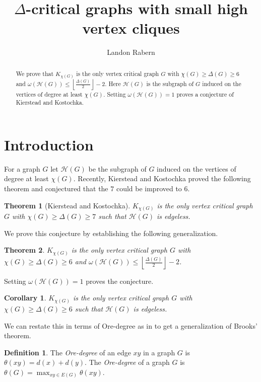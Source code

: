 \documentclass[11pt]{amsart}
\title{$\Delta$-critical graphs with small high vertex cliques}
\author{Landon Rabern}
\theoremstyle{plain}
\newtheorem{thm}{Theorem}
\newtheorem{cor}{Corollary}
\theoremstyle{definition}
\newtheorem{defn}{Definition}
\theoremstyle{remark}
\begin{document}
\begin{abstract}
We prove that $K_{\chi(G)}$ is the only vertex critical graph $G$ with $\chi(G) \geq \Delta(G) \geq 6$ and $\omega(\mathcal{H}(G)) \leq \left \lfloor \frac{\Delta(G)}{2} \right \rfloor - 2$.  Here $\mathcal{H}(G)$ is the subgraph of $G$ induced on the vertices of degree at least $\chi(G)$.  Setting $\omega(\mathcal{H}(G)) = 1$ proves a conjecture of Kierstead and Kostochka.
\end{abstract}
\maketitle

\section{Introduction}
\noindent For a graph $G$ let $\mathcal{H}(G)$ be the subgraph of $G$ induced on the vertices of degree at least $\chi(G)$.  Recently, Kierstead and Kostochka \cite{KK} proved the following theorem and conjectured that the $7$ could be improved to $6$.

\begin{thm}[Kierstead and Kostochka]
$K_{\chi(G)}$ is the only vertex critical graph $G$ with $\chi(G) \geq \Delta(G) \geq 7$ such that $\mathcal{H}(G)$ is edgeless.
\end{thm}

\noindent We prove this conjecture by establishing the following generalization.

\begin{thm}\label{TheoremM}
$K_{\chi(G)}$ is the only vertex critical graph $G$ with $\chi(G) \geq \Delta(G) \geq 6$ and $\omega(\mathcal{H}(G)) \leq \left \lfloor \frac{\Delta(G)}{2} \right \rfloor - 2$.
\end{thm}

\noindent Setting $\omega(\mathcal{H}(G)) = 1$ proves the conjecture.

\begin{cor}\label{CorollaryN}
$K_{\chi(G)}$ is the only vertex critical graph $G$ with $\chi(G) \geq \Delta(G) \geq 6$ such that $\mathcal{H}(G)$ is edgeless.
\end{cor}

\noindent We can restate this in terms of Ore-degree as in \cite{KK} to get a generalization of Brooks' theorem.

\begin{defn}
The \emph{Ore-degree} of an edge $xy$ in a graph $G$ is $\theta(xy) = d(x) + d(y)$.  The \emph{Ore-degree} of a graph $G$ is $\theta(G) = \max_{xy \in E(G)}\theta(xy)$.
\end{defn}
\end{document}
